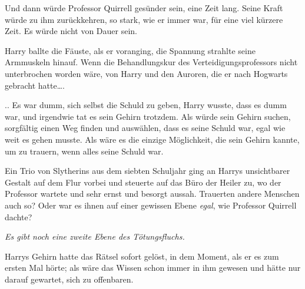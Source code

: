 
Und dann würde Professor Quirrell gesünder sein, eine Zeit lang. Seine Kraft würde zu ihm zurückkehren, so stark, wie er immer war, für eine viel kürzere Zeit. Es würde nicht von Dauer sein.

Harry ballte die Fäuste, als er voranging, die Spannung strahlte seine Armmuskeln hinauf.
Wenn die Behandlungskur des Verteidigungsprofessors nicht unterbrochen worden wäre, von Harry und den Auroren, die er nach Hogwarts gebracht hatte….

.. Es war dumm, sich selbst die Schuld zu geben, Harry wusste, dass es dumm war, und irgendwie tat es sein Gehirn trotzdem. Als würde sein Gehirn suchen, sorgfältig einen Weg finden und auswählen, dass es seine Schuld war, egal wie weit es gehen musste. Als wäre es die einzige Möglichkeit, die sein Gehirn kannte, um zu trauern, wenn alles seine Schuld war.

Ein Trio von Slytherins aus dem siebten Schuljahr ging an Harrys unsichtbarer Gestalt auf dem Flur vorbei und steuerte auf das Büro der Heiler zu, wo der Professor wartete und sehr ernst und besorgt aussah.
Trauerten andere Menschen auch so? Oder war es ihnen auf einer gewissen Ebene \emph{egal}, wie Professor Quirrell dachte?

\emph{Es gibt noch eine zweite Ebene des Tötungsfluchs.}

Harrys Gehirn hatte das Rätsel sofort gelöst, in dem Moment, als er es zum ersten Mal hörte; als wäre das Wissen schon immer in ihm gewesen und hätte nur darauf gewartet, sich zu offenbaren.

